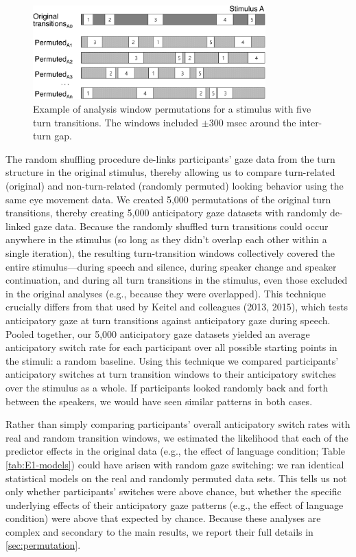 \documentclass[authoryear, 12pt]{elsarticle}
\begin{document}
\begin{figure}[t!]
\begin{center}
\includegraphics[width=0.8\textwidth]{figures/FIG-ShuffledWindows.png}
\end{center}
\caption{Example of analysis window permutations for a stimulus with five turn transitions. The windows included $\pm$300 msec around the inter-turn gap.}
\label{fig:shuffling}
\end{figure}

The random shuffling procedure de-links participants' gaze data from the turn structure in the original stimulus, thereby allowing us to compare turn-related (original) and non-turn-related (randomly permuted) looking behavior using the same eye movement data. We created 5,000 permutations of the original turn transitions, thereby creating 5,000 anticipatory gaze datasets with randomly de-linked gaze data. Because the randomly shuffled turn transitions could occur anywhere in the stimulus (so long as they didn't overlap each other within a single iteration), the resulting turn-transition windows collectively covered the entire stimulus---during speech and silence, during speaker change and speaker continuation, and during all turn transitions in the stimulus, even those excluded in the original analyses (e.g., because they were overlapped). This technique crucially differs from that used by Keitel and colleagues (2013, 2015), which tests anticipatory gaze at turn transitions against anticipatory gaze during speech. Pooled together, our 5,000 anticipatory gaze datasets yielded an average anticipatory switch rate for each participant over all possible starting points in the stimuli: a random baseline. Using this technique we compared participants' anticipatory switches at turn transition windows to their anticipatory switches over the stimulus as a whole. If participants looked randomly back and forth between the speakers, we would have seen similar patterns in both cases.

Rather than simply comparing participants' overall anticipatory switch rates with real and random transition windows, we estimated the likelihood that each of the predictor effects in the original data (e.g., the effect of language condition; Table \ref{tab:E1-models}) could have arisen with random gaze switching: we ran identical statistical models on the real and randomly permuted data sets. This tells us not only whether participants' switches were above chance, but whether the specific underlying effects of their anticipatory gaze patterns (e.g., the effect of language condition) were above that expected by chance. Because these analyses are complex and secondary to the main results, we report their full details in \ref{sec:permutation}.
\end{document}
